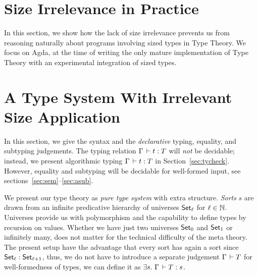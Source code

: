 \documentclass[acmlarge,review,anonymous]{acmart}\settopmatter{printfolios=true}
\begin{document}
\section{Size Irrelevance in Practice}
\label{sec:informal}

In this section, we show how the lack of size irrelevance prevents us from reasoning naturally about programs involving sized types in Type Theory.  We focus on Agda, at the time of writing the only mature implementation of Type Theory with an experimental integration of sized types.





\section{A Type System With Irrelevant Size Application}
\label{sec:syntax}

In this section, we give the syntax and the \emph{declarative} typing, equality, and subtyping judgements.  The typing relation $\Gamma \der t : T$ will \emph{not} be decidable; instead, we present algorithmic typing $\Gamma \der t \jchk T$ in Section~\ref{sec:tycheck}.  However, equality and subtyping will be decidable for well-formed input, see sections~\ref{sec:sem}--\ref{sec:asub}.

We present our type theory as \emph{pure type system} \cite{barendregt:lambdacube} with extra structure.
\emph{Sorts} $s$ are drawn from an infinite predicative hierarchy of universes $\Set[\ell]$ for $\ell \in \NN$.  Universes provide us with polymorphism and the capability to define types by recursion on values.  Whether we have just two universes $\Set[0]$ and $\Set[1]$ or infinitely many, does not matter for the technical difficulty of the meta theory.  The present setup have the advantage that every sort has again a sort since $\Set[\ell] : \Set[\ell+1]$, thus, we do not have to introduce a separate judgement $\Gamma \der T$ for well-formedness of types, we can define it as $\exists s.\ \Gamma \der T : s$.
\end{document}
